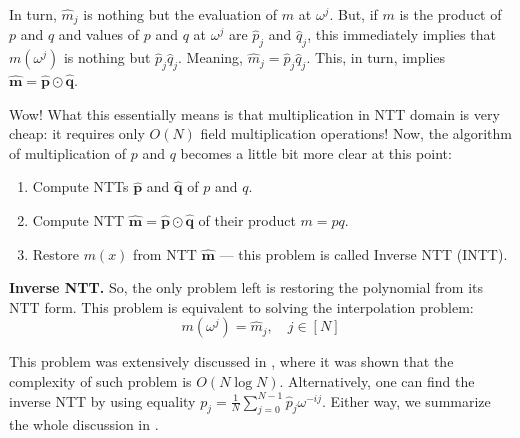 \documentclass[../lecture-notes.tex]{subfiles}
\begin{document}
In turn, $\hat{m}_j$ is nothing but the evaluation of $m$ at $\omega^j$. But, if $m$ is the product of $p$ and $q$
and values of $p$ and $q$ at $\omega^j$ are $\hat{p}_j$ and $\hat{q}_j$, this immediately implies that 
$m(\omega^j)$ is nothing but $\hat{p}_j\hat{q}_j$. Meaning, $\hat{m}_j = \hat{p}_j\hat{q}_j$. This, in turn,
implies $\hat{\boldsymbol{m}} = \hat{\boldsymbol{p}} \odot \hat{\boldsymbol{q}}$.

Wow! What this essentially means is that multiplication in NTT domain is very cheap:
it requires only $O(N)$ field multiplication operations! Now, the algorithm 
of multiplication of $p$ and $q$ becomes a little bit more clear at this point:
\begin{enumerate}
    \item Compute NTTs $\hat{\boldsymbol{p}}$ and $\hat{\boldsymbol{q}}$ of $p$ and $q$.
    \item Compute NTT $\hat{\boldsymbol{m}} = \hat{\boldsymbol{p}} \odot \hat{\boldsymbol{q}}$ of their product $m = pq$.
    \item Restore $m(x)$ from NTT $\hat{\boldsymbol{m}}$ --- this problem is called Inverse NTT (INTT).
\end{enumerate}

\textcolor{green!60!black}{\textbf{Inverse NTT.}} So, the only problem left is restoring the polynomial from 
its NTT form. This problem is equivalent to solving the interpolation problem:
\begin{equation*}
    m(\omega^j) = \hat{m}_j, \quad j \in [N]
\end{equation*}

This problem was extensively discussed in , where it
was shown that the complexity of such problem is $O(N \log N)$. Alternatively,
one can find the inverse NTT by using equality $p_j =
\frac{1}{N}\sum_{j=0}^{N-1}\hat{p}_j\omega^{-ij}$. Either way, we summarize the
whole discussion in .
\end{document}
